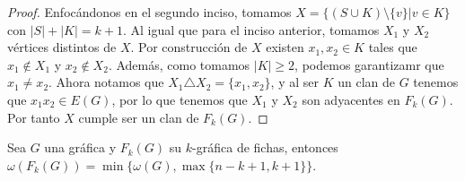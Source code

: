 \begin{proof}
        Enfoc\'andonos en el segundo inciso, tomamos $X = \{(S\cup K) \setminus
        \{v\}| v \in K \}$ con $|S| + |K| = k+1$. Al igual que para el inciso
        anterior, tomamos $X_1$ y $X_2$ v\'ertices distintos de $X$. Por
        construcci\'on de $X$ existen $x_1, x_2 \in K$ tales que $x_1 \notin
        X_1$ y $x_2 \notin X_2$. Adem\'as, como tomamos $|K| \geq 2$, podemos
        garantizamr que $x_1 \neq x_2$. Ahora notamos que $X_1 \triangle X_2 =
        \{x_1, x_2\}$, y al ser $K$ un clan de $G$ tenemos que $x_1x_2 \in
        E(G)$, por lo que tenemos que $X_1$ y $X_2$ son adyacentes en $F_k(G)$.
        Por tanto $X$ cumple ser un clan de $F_k(G)$.
    \end{proof}

    \begin{teorema}
    \label{teo:clan maximo}
        Sea $G$ una gr\'afica y $F_k(G)$ su $k$-gr\'afica de fichas, entonces
        $\omega(F_k(G))= \min \{\omega(G), \max \{n-k+1,k+1\}\}$.
    \end{teorema}

